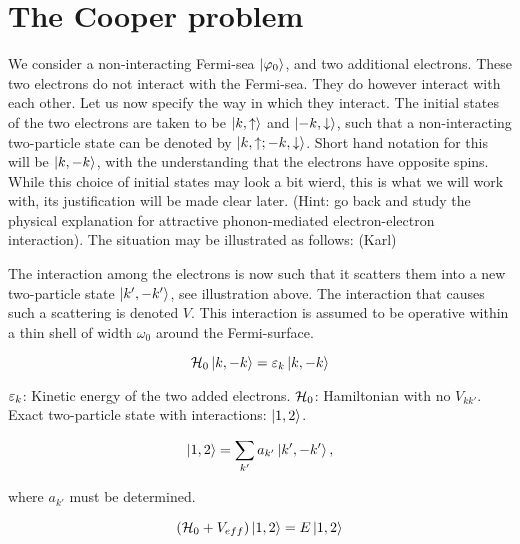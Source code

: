 \section{The Cooper problem}

We consider a non-interacting Fermi-sea $\ket{\varphi_0}$, and two additional electrons. These two electrons do not interact with the Fermi-sea. They do however interact with each other. Let us now specify the way in which they interact. The initial states of the two electrons are taken to be $\ket{k,\uparrow}$ and $\ket{-k, \downarrow}$, such that a non-interacting two-particle state can be denoted by $\ket{k, \uparrow; -k, \downarrow}$. Short hand notation for this will be $\ket{k, -k}$, with the understanding that the electrons have opposite spins. While this choice of initial states may look a bit wierd, this is what we will work with, its justification will be made clear later. (Hint: go back and study the physical explanation for attractive phonon-mediated electron-electron interaction). The situation may be illustrated as follows: (Karl) \\

\begin{figure}
	\centering
	
\end{figure}

The interaction among the electrons is now such that it scatters them into a new two-particle state $\ket{k', -k'}$, see illustration above. The interaction that causes such a scattering is denoted $V$. This interaction is assumed to be operative within a thin shell of width $\omega_0$ around the Fermi-surface. 

\begin{equation}
\mathcal{H}_0 \ket{k,-k} = \varepsilon_k \ket{k,-k}
\end{equation}

$\varepsilon_k$: Kinetic energy of the two added electrons. $\mathcal{H}_0$: Hamiltonian with no $V_{kk'}$. \\

Exact two-particle state with interactions: $\ket{1,2}$. 

\begin{equation}
\ket{1,2} = \sum_{k'} a_{k'}\ket{k', -k'},
\end{equation}

where $a_{k'}$ must be determined. 

\begin{equation}
(\mathcal{H}_0 + V_{eff})\ket{1,2} = E\ket{1,2}
\end{equation}

